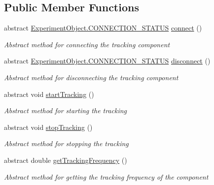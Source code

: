 \subsection*{Public Member Functions}
\begin{DoxyCompactItemize}
\item 
abstract \hyperlink{class_web_analyzer_1_1_u_i_1_1_interaction_objects_1_1_experiment_object_a2875208b4f4b0ed643593152f4ec025c}{Experiment\+Object.\+C\+O\+N\+N\+E\+C\+T\+I\+O\+N\+\_\+\+S\+T\+A\+T\+U\+S} \hyperlink{class_web_analyzer_1_1_models_1_1_base_1_1_base_tracking_model_ae9cca2b18274747b70b51f0d1cc37532}{connect} ()
\begin{DoxyCompactList}\small\item\em Abstract method for connecting the tracking component \end{DoxyCompactList}\item 
abstract \hyperlink{class_web_analyzer_1_1_u_i_1_1_interaction_objects_1_1_experiment_object_a2875208b4f4b0ed643593152f4ec025c}{Experiment\+Object.\+C\+O\+N\+N\+E\+C\+T\+I\+O\+N\+\_\+\+S\+T\+A\+T\+U\+S} \hyperlink{class_web_analyzer_1_1_models_1_1_base_1_1_base_tracking_model_a1540c4d92ded2ce32aa485eafd9e3a12}{disconnect} ()
\begin{DoxyCompactList}\small\item\em Abstract method for disconnecting the tracking component \end{DoxyCompactList}\item 
abstract void \hyperlink{class_web_analyzer_1_1_models_1_1_base_1_1_base_tracking_model_a772a6b05f3976114c432d746510c3ceb}{start\+Tracking} ()
\begin{DoxyCompactList}\small\item\em Abstract method for starting the tracking \end{DoxyCompactList}\item 
abstract void \hyperlink{class_web_analyzer_1_1_models_1_1_base_1_1_base_tracking_model_a22286c5202de039794f020d3fed12ae1}{stop\+Tracking} ()
\begin{DoxyCompactList}\small\item\em Abstract method for stopping the tracking \end{DoxyCompactList}\item 
abstract double \hyperlink{class_web_analyzer_1_1_models_1_1_base_1_1_base_tracking_model_ab79ef77eec8b92c3c7e536e25642af56}{get\+Tracking\+Frequency} ()
\begin{DoxyCompactList}\small\item\em Abstract method for getting the tracking frequency of the component \end{DoxyCompactList}\end{DoxyCompactItemize}
